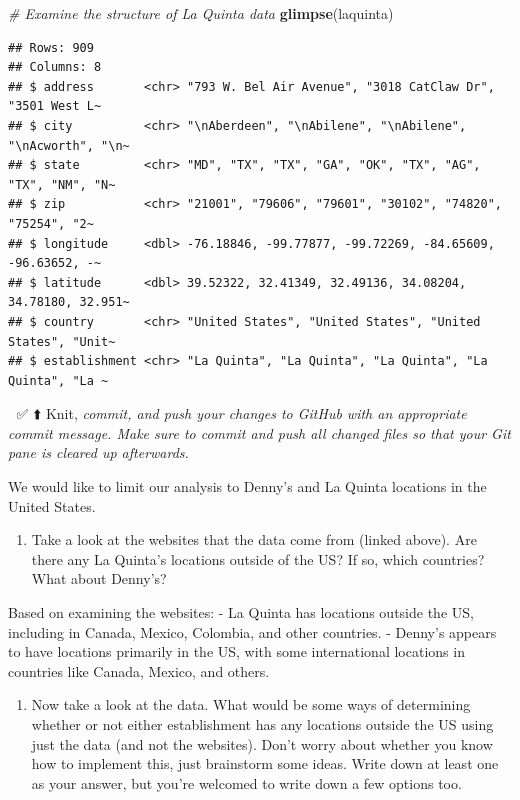 \documentclass[
]{article}
\newenvironment{Shaded}{\begin{snugshade}}{\end{snugshade}}
\newcommand{\CommentTok}[1]{\textcolor[rgb]{0.56,0.35,0.01}{\textit{#1}}}
\newcommand{\FunctionTok}[1]{\textcolor[rgb]{0.13,0.29,0.53}{\textbf{#1}}}
\newcommand{\NormalTok}[1]{#1}
\providecommand{\tightlist}{%
  \setlength{\itemsep}{0pt}\setlength{\parskip}{0pt}}
\begin{document}
\begin{Shaded}
\begin{Highlighting}[]
\CommentTok{\# Examine the structure of La Quinta data}
\FunctionTok{glimpse}\NormalTok{(laquinta)}
\end{Highlighting}
\end{Shaded}

\begin{verbatim}
## Rows: 909
## Columns: 8
## $ address       <chr> "793 W. Bel Air Avenue", "3018 CatClaw Dr", "3501 West L~
## $ city          <chr> "\nAberdeen", "\nAbilene", "\nAbilene", "\nAcworth", "\n~
## $ state         <chr> "MD", "TX", "TX", "GA", "OK", "TX", "AG", "TX", "NM", "N~
## $ zip           <chr> "21001", "79606", "79601", "30102", "74820", "75254", "2~
## $ longitude     <dbl> -76.18846, -99.77877, -99.72269, -84.65609, -96.63652, -~
## $ latitude      <dbl> 39.52322, 32.41349, 32.49136, 34.08204, 34.78180, 32.951~
## $ country       <chr> "United States", "United States", "United States", "Unit~
## $ establishment <chr> "La Quinta", "La Quinta", "La Quinta", "La Quinta", "La ~
\end{verbatim}

🧶 ✅ ⬆️ Knit, \emph{commit, and push your changes to GitHub with an
appropriate commit message. Make sure to commit and push all changed
files so that your Git pane is cleared up afterwards.}

We would like to limit our analysis to Denny's and La Quinta locations
in the United States.

\begin{enumerate}
\def\labelenumi{\arabic{enumi}.}
\setcounter{enumi}{2}
\tightlist
\item
  Take a look at the websites that the data come from (linked above).
  Are there any La Quinta's locations outside of the US? If so, which
  countries? What about Denny's?
\end{enumerate}

Based on examining the websites: - La Quinta has locations outside the
US, including in Canada, Mexico, Colombia, and other countries. -
Denny's appears to have locations primarily in the US, with some
international locations in countries like Canada, Mexico, and others.

\begin{enumerate}
\def\labelenumi{\arabic{enumi}.}
\setcounter{enumi}{3}
\tightlist
\item
  Now take a look at the data. What would be some ways of determining
  whether or not either establishment has any locations outside the US
  using just the data (and not the websites). Don't worry about whether
  you know how to implement this, just brainstorm some ideas. Write down
  at least one as your answer, but you're welcomed to write down a few
  options too.
\end{enumerate}
\end{document}
